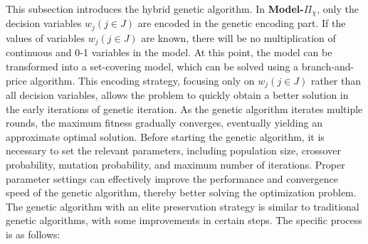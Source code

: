 \documentclass[]{article}
\theoremstyle{plain}%
\theoremstyle{definition}
\theoremstyle{remark}
\theoremstyle{plain}%
\begin{document}
    This subsection introduces the hybrid genetic algorithm. In \textbf{Model-}$\Pi_\chi$, only the decision variables $w_j(j\in J)$ are encoded in the genetic encoding part. If the values of variables $w_j(j\in J)$  are known, there will be no multiplication of continuous and 0-1 variables in the model. At this point, the model can be transformed into a set-covering model, which can be solved using a branch-and-price algorithm. This encoding strategy, focusing only on $w_j(j\in J)$ rather than all decision variables, allows the problem to quickly obtain a better solution in the early iterations of genetic iteration. As the genetic algorithm iterates multiple rounds, the maximum fitness gradually converges, eventually yielding an approximate optimal solution.
    Before starting the genetic algorithm, it is necessary to set the relevant parameters, including population size, crossover probability, mutation probability, and maximum number of iterations. Proper parameter settings can effectively improve the performance and convergence speed of the genetic algorithm, thereby better solving the optimization problem.
    The genetic algorithm with an elite preservation strategy is similar to traditional genetic algorithms, with some improvements in certain steps. The specific process is as follows:
\end{document}
